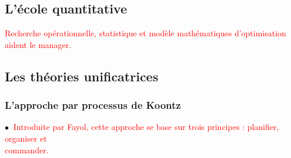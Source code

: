 \documentclass[letterpaper, 12pt]{article}
\newcommand{\red}[1]{
	\textcolor{red}{#1}
}
\newcommand{\point}{$\bullet\ $}
\newcommand{\alinea}{
\hspace*{0.3cm}}
\begin{document}
	\subsection{L'\'ecole quantitative}
		\red{Recherche op\'erationnelle, statistique et mod\`ele math\'ematiques d'optimisation
		aident le manager.}
	\subsection{Les th\'eories unificatrices}
		\subsubsection{L'approche par processus de Koontz}
			\point \red{Introduite par Fayol, cette approche se base sur trois principes : planifier,
				organiser et\\
				\alinea commander.}
\end{document}
